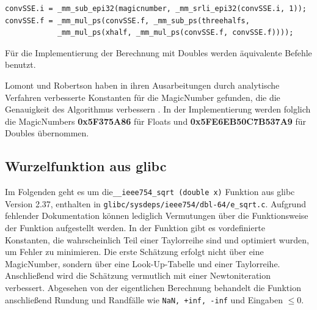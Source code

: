 \documentclass[course=erap]{aspdoc}
\begin{document}
\begin{lstlisting}
convSSE.i = _mm_sub_epi32(magicnumber, _mm_srli_epi32(convSSE.i, 1));
convSSE.f = _mm_mul_ps(convSSE.f, _mm_sub_ps(threehalfs, 
            _mm_mul_ps(xhalf, _mm_mul_ps(convSSE.f, convSSE.f))));
\end{lstlisting}
Für die Implementierung der Berechnung mit Doubles werden äquivalente Befehle benutzt. \par 
Lomont und Robertson haben in ihren Ausarbeitungen durch analytische Verfahren verbesserte Konstanten für die MagicNumber gefunden, die die Genauigkeit des Algorithmus verbessern \cite{Robertson}. In der Implementierung werden folglich die MagicNumbers \textbf{0x5F375A86} für Floats und \textbf{0x5FE6EB50C7B537A9} für Doubles übernommen.
\subsection{Wurzelfunktion aus glibc}
Im Folgenden geht es um die\lstinline{__ieee754_sqrt (double x)} Funktion aus glibc Version 2.37, enthalten in \lstinline{glibc/sysdeps/ieee754/dbl-64/e_sqrt.c}. Aufgrund fehlender Dokumentation können lediglich Vermutungen über die Funktionsweise der Funktion aufgestellt werden. In der Funktion gibt es vordefinierte Konstanten, die wahrscheinlich Teil einer Taylorreihe sind und optimiert wurden, um Fehler zu minimieren. Die erste Schätzung erfolgt nicht über eine MagicNumber, sondern über eine Look-Up-Tabelle und einer Taylorreihe. Anschließend wird die Schätzung vermutlich mit einer Newtoniteration verbessert. Abgesehen von der eigentlichen Berechnung behandelt die Funktion anschließend Rundung und Randfälle wie \lstinline{NaN, +inf, -inf} und Eingaben $\le 0$.
\end{document}
